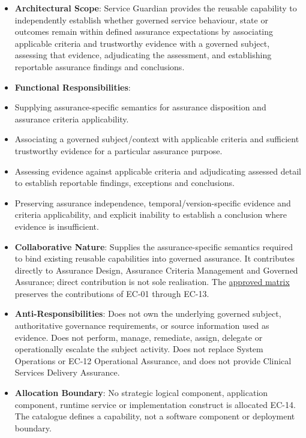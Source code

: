 \begin{itemize}


\item \textbf{Architectural Scope}: Service Guardian provides the reusable capability to independently establish whether governed service behaviour, state or outcomes remain within defined assurance expectations by associating applicable criteria and trustworthy evidence with a governed subject, assessing that evidence, adjudicating the assessment, and establishing reportable assurance findings and conclusions.

\item \textbf{Functional Responsibilities}:

\item Supplying assurance-specific semantics for assurance disposition and assurance criteria applicability.

\item Associating a governed subject/context with applicable criteria and sufficient trustworthy evidence for a particular assurance purpose.

\item Assessing evidence against applicable criteria and adjudicating assessed detail to establish reportable findings, exceptions and conclusions.

\item Preserving assurance independence, temporal/version-specific evidence and criteria applicability, and explicit inability to establish a conclusion where evidence is insufficient.

\item \textbf{Collaborative Nature}: Supplies the assurance-specific semantics required to bind existing reusable capabilities into governed assurance. It contributes directly to Assurance Design, Assurance Criteria Management and Governed Assurance; direct contribution is not sole realisation. The \href{\detokenize{../../../../../../../../docs/markdown/02-strategy/capability-maps/health-service-assurance-derivation.md#collaborative-enterprise-capability-contribution-matrix}}{approved matrix} preserves the contributions of EC-01 through EC-13.

\item \textbf{Anti-Responsibilities}: Does not own the underlying governed subject, authoritative governance requirements, or source information used as evidence. Does not perform, manage, remediate, assign, delegate or operationally escalate the subject activity. Does not replace System Operations or EC-12 Operational Assurance, and does not provide Clinical Services Delivery Assurance.

\item \textbf{Allocation Boundary}: No strategic logical component, application component, runtime service or implementation construct is allocated EC-14. The catalogue defines a capability, not a software component or deployment boundary.

\end{itemize}


